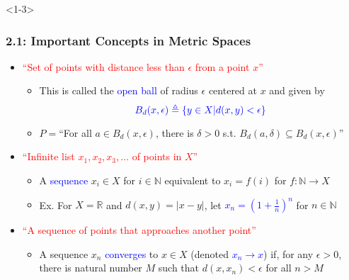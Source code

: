 \documentclass[10pt,english,aspectratio=169,handout]{beamer}
\begin{document}
\begin{frame}<1-3> \frametitle{2.1: Important Concepts in Metric Spaces}

\begin{itemize}
\setlength\itemsep{5mm}
\item<1-> \textcolor{red}{``Set of points with distance less than $\epsilon$ from a point $x$''} \vspace{1mm}
\begin{itemize} 
  \setlength\itemsep{1.5mm}
  \item This is called the \textcolor{blue}{open ball} of radius $\epsilon$ centered at $x$ and given by \vspace{-1mm} \[\color{blue} B_d(x,\epsilon) \triangleq \left\{ y \in X | d(x,y) < \epsilon \right\} \vspace{-5mm} \]
  \item $P=$``For all $a\!\in\! B_d (x,\epsilon)$, there is $\delta\!>\!0$ s.t. $B_d (a,\delta) \subseteq B_d (x,\epsilon)$''
\end{itemize}

\item<2-> \textcolor{red}{``Infinite list $x_1,x_2,x_3,\ldots$ of points in $X$''} \vspace{1mm}
\begin{itemize} 
  \setlength\itemsep{1.5mm}
  \item A \textcolor{blue}{sequence} $x_i \in X$ for $i\in \mathbb{N}$ equivalent to $x_i = f(i)$ for $f:\mathbb{N}\to X$
  \item Ex. For $X=\mathbb{R}$ and $d(x,y)=|x-y|$, let \textcolor{blue}{$x_n = \left(1+\frac{1}{n}\right)^n$} for $n\in \mathbb{N}$
\end{itemize}

\item<3-> \textcolor{red}{``A sequence of points that approaches another point''} \vspace{1mm}
\begin{itemize} 
  \setlength\itemsep{1.5mm}
  \item A sequence $x_n$ \textcolor{blue}{converges} to $x\in X$ (denoted \textcolor{blue}{$x_n \to x$})  if, for any $\epsilon >0$, there is natural number $M$ such that $d(x,x_n) < \epsilon$ for all $n>M$
\end{itemize}
  
\end{itemize}


\end{frame}
\end{document}
